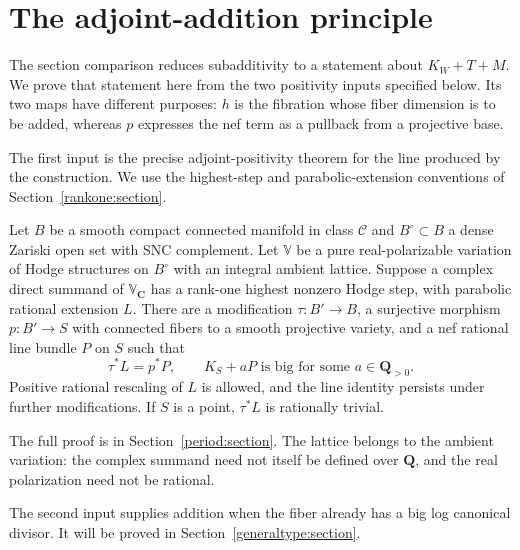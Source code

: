 \section{The adjoint-addition principle}\label{addition:section}

The section comparison reduces subadditivity to a statement about
$K_W+T+M$. We prove that statement here from the two positivity
inputs specified below. Its two maps have different purposes:
$h$ is the fibration whose fiber dimension is to be added, whereas
$p$ expresses the nef term as a pullback from a projective base.

The first input is the precise adjoint-positivity theorem for the
line produced by the construction. We use the highest-step and
parabolic-extension conventions of Section~\ref{rankone:section}.

\begin{theorem}\label{period:adjoint}
Let $B$ be a smooth compact connected manifold in class $\mathcal C$
and $B^\circ\subset B$ a dense Zariski open set with SNC complement.
Let $\mathbb V$ be a pure real-polarizable variation of Hodge
structures on $B^\circ$ with an integral ambient lattice. Suppose
a complex direct summand of $\mathbb V_{\mathbf C}$ has a
rank-one highest nonzero Hodge step, with parabolic rational
extension $L$. There are a modification $\tau:B'\to B$, a
surjective morphism $p:B'\to S$ with connected fibers to a smooth
projective variety, and a nef rational line bundle $P$ on $S$ such that
\begin{equation}\label{period:conclusion}
 \tau^*L=p^*P,\qquad K_S+aP\text{ is big for some }a\in\mathbf Q_{>0}.
\end{equation}
Positive rational rescaling of $L$ is allowed, and the line identity
persists under further modifications. If $S$ is a point, $\tau^*L$
is rationally trivial.
\end{theorem}

The full proof is in Section~\ref{period:section}. The lattice belongs to the ambient
variation: the complex summand need not itself be defined over
$\mathbf Q$, and the real polarization need not be rational.

The second input supplies addition when the fiber already has a big
log canonical divisor. It will be proved in Section~\ref{generaltype:section}.

